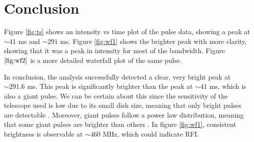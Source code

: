 \documentclass{article}
\begin{document}
\section{Conclusion}
Figure \ref{fig:ts} shows an intensity vs time plot of the pulse data, showing a peak at $\sim 41$ ms and $\sim 291$ ms. Figure \ref{fig:wf1} shows the brighter peak with more clarity, showing that it was a peak in intensity for most of the bandwidth. Figure $\ref{fig:wf2}$ is a more detailed waterfall plot of the same pulse.

In conclusion, the analysis successfully detected a clear, very bright peak at $\sim 291.6$ ms. This peak is significantly brighter than the peak at $\sim 41$ ms, which is also a giant pulse. We can be certain about this since the sensitivity of the telescope used is low due to its small dish size, meaning that only bright pulses are detectable \cite{2012hpa..book.....L}. Moreover, giant pulses follow a power law distribution, meaning that some giant pulses are brighter than others \cite{2019MNRAS.490L..12B}. In figure \ref{fig:wf1}, consistent brightness is observable at $\sim 460$ MHz, which could indicate RFI.

\printbibliography
\end{document}
